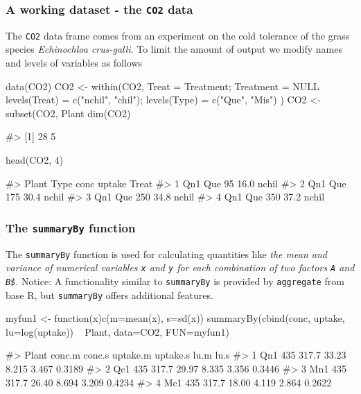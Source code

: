 \hypertarget{a-working-dataset---the-co2-data}{%
\subsubsection{\texorpdfstring{A working dataset - the \texttt{CO2}
data}{A working dataset - the CO2 data}}\label{a-working-dataset---the-co2-data}}

The \texttt{CO2} data frame comes from an experiment on the cold
tolerance of the grass species \emph{Echinochloa crus-galli}. To limit
the amount of output we modify names and levels of variables as follows

\begin{Schunk}
\begin{Sinput}
data(CO2)
CO2 <- within(CO2, {
    Treat = Treatment; Treatment = NULL
    levels(Treat) = c("nchil", "chil"); levels(Type) = c("Que", "Mis")
})
CO2 <- subset(CO2, Plant %
dim(CO2)
\end{Sinput}
\begin{Soutput}
#> [1] 28  5
\end{Soutput}
\begin{Sinput}
head(CO2, 4)
\end{Sinput}
\begin{Soutput}
#>   Plant Type conc uptake Treat
#> 1   Qn1  Que   95   16.0 nchil
#> 2   Qn1  Que  175   30.4 nchil
#> 3   Qn1  Que  250   34.8 nchil
#> 4   Qn1  Que  350   37.2 nchil
\end{Soutput}
\end{Schunk}

\hypertarget{the-summaryby-function}{%
\subsubsection{\texorpdfstring{The \texttt{summaryBy}
function}{The summaryBy function}}\label{the-summaryby-function}}

The \texttt{summaryBy} function is used for calculating quantities like
\emph{the mean and variance of numerical variables \texttt{x} and
\texttt{y} for each combination of two factors \texttt{A} and
\texttt{B\$}}. Notice: A functionality similar to \texttt{summaryBy} is
provided by \texttt{aggregate} from base R, but \texttt{summaryBy}
offers additional features.

\begin{Schunk}
\begin{Sinput}
myfun1 <- function(x){c(m=mean(x), s=sd(x))}
summaryBy(cbind(conc, uptake, lu=log(uptake)) ~ Plant, data=CO2, FUN=myfun1)
\end{Sinput}
\begin{Soutput}
#>   Plant conc.m conc.s uptake.m uptake.s  lu.m   lu.s
#> 1   Qn1    435  317.7    33.23    8.215 3.467 0.3189
#> 2   Qc1    435  317.7    29.97    8.335 3.356 0.3446
#> 3   Mn1    435  317.7    26.40    8.694 3.209 0.4234
#> 4   Mc1    435  317.7    18.00    4.119 2.864 0.2622
\end{Soutput}
\end{Schunk}

